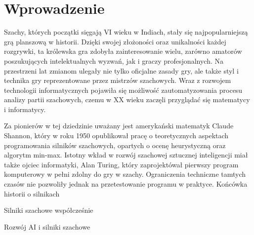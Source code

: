 \section{Wprowadzenie}
\label{sec:wprowadzenie}

Szachy, których początki sięgają VI wieku w Indiach, stały się najpopularniejszą grą planszową w historii.
Dzięki swojej złożoności oraz unikalności każdej rozgrywki, ta królewska gra zdobyła zainteresowanie wielu, zarówno amatorów poszukujących intelektualnych wyzwań, jak i graczy profesjonalnych.
Na przestrzeni lat zmianom ulegały nie tylko oficjalne zasady gry, ale także styl i technika gry reprezentowane przez mistrzów szachowych.
Wraz z rozwojem technologii informatycznych pojawiła się możliwość zautomatyzowania procesu analizy partii szachowych, czemu w XX wieku zaczęli przyglądać się matematycy i informatycy.

Za pionierów w tej dziedzinie uważany jest amerykański matematyk Claude Shannon, który w roku 1950 opublikował pracę o teoretycznych aspektach programowania silników szachowych, opartych o ocenę heurystyczną oraz algorytm min-max.
Istotny wkład w rozwój szachowej sztucznej inteligencji miał także ojciec informatyki, Alan Turing, który zaprojektówał pierwszy program komputerowy w pełni zdolny do gry w szachy.
Ograniczenia techniczne tamtych czasów nie pozwoliły jednak na przetestowanie programu w praktyce.
Końcówka historii o silnikach

Silniki szachowe współcześnie

Rozwój AI i silniki szachowe

